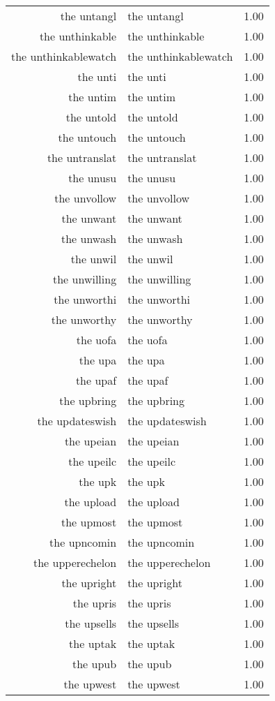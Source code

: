 \begin{table}[ht]
\begin{tabular}{rlr}
  the untangl & the untangl & 1.00 \\ 
  the unthinkable & the unthinkable & 1.00 \\ 
  the unthinkablewatch & the unthinkablewatch & 1.00 \\ 
  the unti & the unti & 1.00 \\ 
  the untim & the untim & 1.00 \\ 
  the untold & the untold & 1.00 \\ 
  the untouch & the untouch & 1.00 \\ 
  the untranslat & the untranslat & 1.00 \\ 
  the unusu & the unusu & 1.00 \\ 
  the unvollow & the unvollow & 1.00 \\ 
  the unwant & the unwant & 1.00 \\ 
  the unwash & the unwash & 1.00 \\ 
  the unwil & the unwil & 1.00 \\ 
  the unwilling & the unwilling & 1.00 \\ 
  the unworthi & the unworthi & 1.00 \\ 
  the unworthy & the unworthy & 1.00 \\ 
  the uofa & the uofa & 1.00 \\ 
  the upa & the upa & 1.00 \\ 
  the upaf & the upaf & 1.00 \\ 
  the upbring & the upbring & 1.00 \\ 
  the updateswish & the updateswish & 1.00 \\ 
  the upeian & the upeian & 1.00 \\ 
  the upeilc & the upeilc & 1.00 \\ 
  the upk & the upk & 1.00 \\ 
  the upload & the upload & 1.00 \\ 
  the upmost & the upmost & 1.00 \\ 
  the upncomin & the upncomin & 1.00 \\ 
  the upperechelon & the upperechelon & 1.00 \\ 
  the upright & the upright & 1.00 \\ 
  the upris & the upris & 1.00 \\ 
  the upsells & the upsells & 1.00 \\ 
  the uptak & the uptak & 1.00 \\ 
  the upub & the upub & 1.00 \\ 
  the upwest & the upwest & 1.00 \\ 

\end{tabular}
\end{table}
